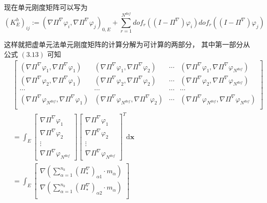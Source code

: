 现在单元刚度矩阵可以写为 \\
\begin{equation}
(K_{E}^h)_{ij} := (\nabla \Pi^{\nabla}\varphi_i, \nabla \Pi^{\nabla}\varphi_j)_{0,E} + \sum_{r = 1}^{N^{dof}} dof_r((I-\Pi^{\nabla})\varphi_i) dof_r((I-\Pi^{\nabla})\varphi_j)
\end{equation}

这样就把虚单元法单元刚度矩阵的计算分解为可计算的两部分， 其中第一部分从公式
$(3.13)$ 可知 \\
\begin{equation}
\begin{aligned}
&\begin{bmatrix}
(\nabla\Pi^\nabla\varphi_1, \nabla\Pi^\nabla\varphi_1) & (\nabla\Pi^\nabla\varphi_1, \nabla\Pi^\nabla\varphi_2) & \cdots & (\nabla\Pi^\nabla\varphi_1, \nabla\Pi^\nabla\varphi_{N^{dof}})\\
(\nabla\Pi^\nabla\varphi_2, \nabla\Pi^\nabla\varphi_1) & (\nabla\Pi^\nabla\varphi_2, \nabla\Pi^\nabla\varphi_2) & \cdots & (\nabla\Pi^\nabla\varphi_2, \nabla\Pi^\nabla\varphi_{N^{dof}})\\
\cdots & \cdots & \cdots & \cdots \\
(\nabla\Pi^\nabla\varphi_{N^{dof}}, \nabla\Pi^\nabla\varphi_1) & (\nabla\Pi^\nabla\varphi_{N^{dof}}, \nabla\Pi^\nabla\varphi_2) & \cdots & (\nabla\Pi^\nabla\varphi_{N^{dof}}, \nabla\Pi^\nabla\varphi_{N^{dof}})\\
\end{bmatrix}\\
& = \int_E \begin{bmatrix} 
\nabla\Pi^\nabla\varphi_1\\ 
\nabla\Pi^\nabla\varphi_2 \\ 
\vdots\\
\nabla\Pi^\nabla\varphi_{N^{dof}}
\end{bmatrix}\begin{bmatrix} 
\nabla\Pi^\nabla\varphi_1\\ 
\nabla\Pi^\nabla\varphi_2 \\ 
\vdots\\
\nabla\Pi^\nabla\varphi_{N^{dof}}
\end{bmatrix}^T\mathrm d \mathbf x\\
& = \int_E \begin{bmatrix} 
\nabla(\sum_{\alpha = 1}^{n_k}(\Pi_{*}^{\nabla})_{\alpha 1}\cdot m_{\alpha})\\ 
\nabla(\sum_{\alpha = 1}^{n_k}(\Pi_{*}^{\nabla})_{\alpha 2}\cdot m_{\alpha}) \\ 

\end{bmatrix}
\end{aligned}
\end{equation}
